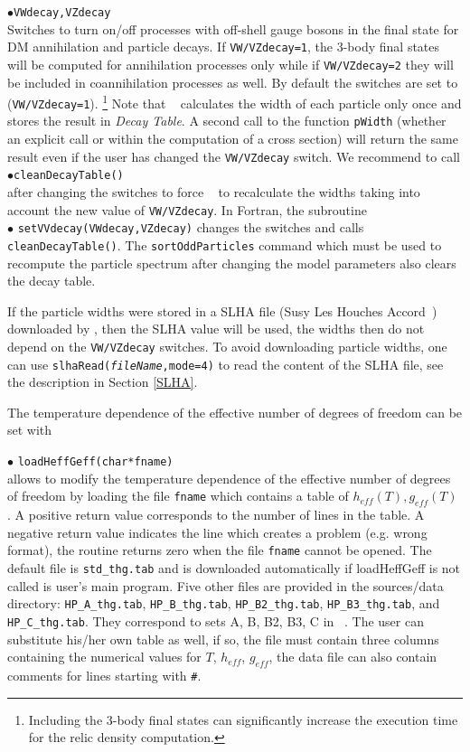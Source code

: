\documentclass[12pt,a4paper]{article}
\begin{document}
\noindent
$\bullet$\verb|VWdecay,VZdecay|\\
Switches to turn on/off  processes with off-shell gauge bosons in the final state for DM annihilation and particle decays.
If \verb|VW/VZdecay=1|, the  3-body final states will be computed for annihilation processes only while 
if \verb|VW/VZdecay=2| they will be included in coannihilation processes as well.
By  default  the switches are set to (\verb|VW/VZdecay=1|). \footnote{Including the 3-body final states can significantly increase the execution time for the relic density computation.}
Note that \micro~ calculates the width of each particle only once and stores the
result in {\it Decay Table}.  A second call to the function \verb|pWidth| (whether an explicit call or within the computation of a cross section)   will return the same result  even if the user has changed the {\tt VW/VZdecay} switch.  
We recommend to call\\
$\bullet$\verb|cleanDecayTable()| \\
after changing the switches to force \micro~ to recalculate the widths taking into account  the new value of {\tt VW/VZdecay}.
In Fortran, the subroutine\\
$\bullet$ \verb|setVVdecay(VWdecay,VZdecay)| changes the
switches and calls {\tt cleanDecayTable()}.
The   {\tt sortOddParticles} command which must be used 
to recompute the particle spectrum after changing the model parameters also clears  the decay table.

If the particle widths  were stored in a SLHA file (Susy Les Houches Accord~\cite{Skands:2003cj})  downloaded by \micro, then the SLHA value will be used,
the widths  then do not depend on  the {\tt VW/VZdecay} switches. To avoid downloading particle widths, one can use  
{\tt slhaRead({\it fileName},mode=4)} to read the content of the SLHA file, see the description in Section
\ref{SLHA}. 

The temperature dependence of the effective number of degrees of freedom can be set with

\noindent$\bullet$ \verb|loadHeffGeff(char*fname)|\\
allows to modify the temperature dependence of the effective number of degrees of freedom
by loading the file \verb|fname| which contains a table of $h_{eff}(T), g_{eff}(T)$ . 
A positive  return value corresponds to the number of lines in the table. A negative return value indicates the line which creates a problem (e.g. wrong format), the routine returns zero when the file \verb|fname| cannot be opened.  The default file is \verb|std_thg.tab| and is downloaded automatically if 
loadHeffGeff is not called is user's main program. Five other files are provided in the sources/data directory:  \verb|HP_A_thg.tab|,  \verb|HP_B_thg.tab|, \verb|HP_B2_thg.tab|,  \verb|HP_B3_thg.tab|,    and \verb|HP_C_thg.tab|. They   correspond to sets A, B, B2, B3, C in ~\cite{Hindmarsh:2005ix}.
The user can substitute his/her own table as well, if so, the file must contain three columns containing the numerical values for $T$, $h_{eff}$, $g_{eff}$, the data file can also contain comments for lines starting with \verb|#|.
\end{document}

